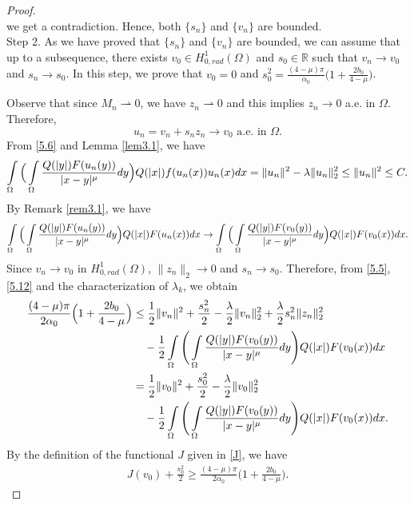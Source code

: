 \documentclass[10pt,a4paper]{amsart}
\newcommand{\R}{\mathbb{R}}
\newcommand{\hr}{H^1_{0, rad}(\Omega)}
\begin{document}
\begin{proof}
\begin{equation*}
		\end{equation*}
		we get a contradiction. Hence, both $\{s_n\}$ and $\{v_n\}$ are bounded. \\
		Step 2. As we have proved that $\{s_n\}$ and $\{v_n\}$ are bounded, we can assume that up to a subsequence, there exists $v_0 \in \hr$ and $s_0\in \R$ such that $v_n \rightarrow v_0$ and $s_n \rightarrow s_0$. In this step, we prove that $v_0=0$ and $s_0^2 = \frac{(4-\mu)\pi}{\alpha_0}\Big( 1+\frac{2b_0}{4-\mu}\Big)$.
		
		Observe that since $M_n \rightharpoonup 0$, we have $ z_n \rightharpoonup 0$ and this implies $z_n \to 0$ a.e. in $\Omega$. Therefore, 
		\[u_n=v_n+s_n z_n \to v_0 \text{ a.e. in } \Omega.\]
		From \eqref{5.6} and Lemma \ref{lem3.1}, we have
		\begin{align*} \int\limits\limits_\Omega \Big( \int\limits\limits_\Omega \frac{Q(|y|)F(u_n(y))}{|x-y|^\mu}dy \Big) Q(|x|)f(u_n(x))u_n(x)dx = \|u_n\|^2 - \lambda\|u_n\|^2_2\leq  \|u_n\|^2 \leq C.
		\end{align*}
		By Remark \ref{rem3.1}, we have 
		\begin{equation} 
			\label{5.12}
			\int\limits\limits_\Omega \Big( \int\limits\limits_\Omega \frac{Q(|y|)F(u_n(y))}{|x-y|^\mu}dy \Big) Q(|x|)F(u_n(x)) dx \rightarrow \int\limits\limits_\Omega \Big( \int\limits\limits_\Omega \frac{Q(|y|)F(v_0(y))}{|x-y|^\mu}dy \Big) Q(|x|)F(v_0(x))dx.
		\end{equation}
		Since $v_n \rightarrow v_0$ in $\hr$, $\|z_n\|_2 \rightarrow 0$ and $s_n\to s_0$. Therefore, from \eqref{5.5}, \eqref{5.12} and the characterization of $\lambda_k$, we obtain
		\begin{align*}
			\frac{(4-\mu)\pi}{2\alpha_0} \Big( 1+\frac{2b_0}{4-\mu}\Big)&\leq \frac{1}{2} \|v_n\|^2 + \frac{s_n^2}{2} - \frac{\lambda}{2} \|v_n\|^2_2+ \frac{\lambda}{2} s_n^2 \|z_n\|_2^2\\
			&\quad- \frac{1}{2} \int\limits\limits_\Omega \Bigg( \int\limits\limits_\Omega \frac{Q(|y|)F(v_0(y))}{|x-y|^\mu}dy \Bigg) Q(|x|)F(v_0(x))dx\\
			& = \frac{1}{2} \|v_0\|^2 + \frac{s_0^2}{2} - \frac{\lambda}{2} \|v_0\|^2_2 \\
			&\quad- \frac{1}{2} \int\limits\limits_\Omega \Bigg( \int\limits\limits_\Omega \frac{Q(|y|)F(v_0(y))}{|x-y|^\mu}dy \Bigg) Q(|x|)F(v_0(x))dx.
		\end{align*}
		By the definition of the functional $J$ given in \eqref{J}, we have
		\begin{align}
			\label{6.1}
			J(v_0) + \frac{s_0^2}{2} \geq 	\frac{(4-\mu)\pi}{2\alpha_0} \Big( 1+\frac{2b_0}{4-\mu}\Big).

\end{align}
\end{proof}
\end{document}
